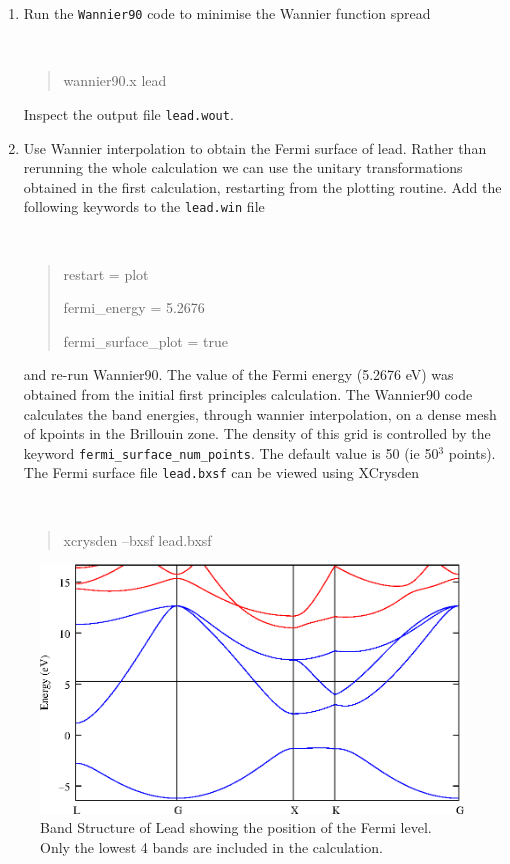 \documentclass[a4paper,11pt,twoside]{article}
\begin{document}
\begin{enumerate}
\item Run the {\tt Wannier90} code to minimise the Wannier function spread
{\tt
\begin{quote}
wannier90.x lead
\end{quote} }
Inspect the output file {\tt lead.wout}.
\item Use Wannier interpolation to obtain the Fermi surface of lead. Rather than rerunning the whole calculation we can use the unitary transformations obtained in the first calculation, restarting from the plotting routine. Add the following keywords to the {\tt lead.win} file
{\tt
\begin{quote}
restart = plot

fermi\_energy = 5.2676

fermi\_surface\_plot = true
\end{quote} }
and re-run Wannier90. The value of the Fermi energy (5.2676 eV) was obtained from the initial first principles calculation. The Wannier90 code calculates the band energies, through wannier interpolation, on a dense mesh of kpoints in the Brillouin zone. The density of this grid is controlled by the keyword {\tt fermi\_surface\_num\_points}. The default value is 50 (ie 50$^3$ points).
The Fermi surface file {\tt lead.bxsf} can be viewed using XCrysden
{\tt
\begin{quote}
xcrysden --bxsf lead.bxsf
\end{quote} }
\end{enumerate}

\begin{figure}[h]
\begin{center}
\includegraphics{lead.eps}
\caption{Band Structure of Lead showing the position of the Fermi level. Only the lowest 4 bands are included in the calculation.}
\label{fig:pb-bnd}
\end{center}
\end{figure}
\end{document}
